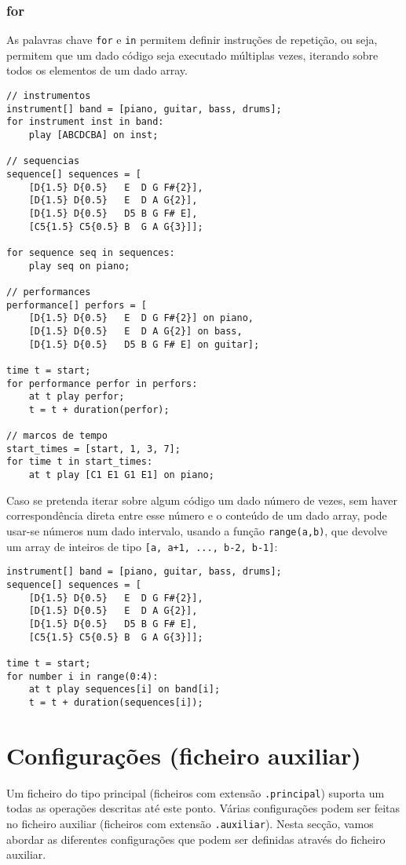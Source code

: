 \documentclass{article}
\begin{document}
\subsubsection{for}
As palavras chave \texttt{for} e \texttt{in} permitem definir instruções de repetição, ou seja, permitem que um dado código seja executado múltiplas vezes, iterando sobre todos os elementos de um dado array.
\begin{lstlisting} 
// instrumentos 
instrument[] band = [piano, guitar, bass, drums];
for instrument inst in band:
    play [ABCDCBA] on inst;

// sequencias
sequence[] sequences = [
    [D{1.5} D{0.5}   E  D G F#{2}], 
    [D{1.5} D{0.5}   E  D A G{2}],
    [D{1.5} D{0.5}   D5 B G F# E],
    [C5{1.5} C5{0.5} B  G A G{3}]];
    
for sequence seq in sequences:
    play seq on piano;
    
// performances
performance[] perfors = [
    [D{1.5} D{0.5}   E  D G F#{2}] on piano, 
    [D{1.5} D{0.5}   E  D A G{2}] on bass,
    [D{1.5} D{0.5}   D5 B G F# E] on guitar];
    
time t = start;
for performance perfor in perfors:
    at t play perfor;
    t = t + duration(perfor);

// marcos de tempo
start_times = [start, 1, 3, 7];
for time t in start_times:
    at t play [C1 E1 G1 E1] on piano;
\end{lstlisting}

Caso se pretenda iterar sobre algum código um dado número de vezes, sem haver correspondência direta entre esse número e o conteúdo de um dado array, pode usar-se números num dado intervalo, usando a função \texttt{range(a,b)}, que devolve um array de inteiros de tipo \texttt{[a, a+1, ..., b-2, b-1]}:
\begin{lstlisting} 
instrument[] band = [piano, guitar, bass, drums];
sequence[] sequences = [
    [D{1.5} D{0.5}   E  D G F#{2}], 
    [D{1.5} D{0.5}   E  D A G{2}],
    [D{1.5} D{0.5}   D5 B G F# E],
    [C5{1.5} C5{0.5} B  G A G{3}]];

time t = start;
for number i in range(0:4):
    at t play sequences[i] on band[i];
    t = t + duration(sequences[i]);
\end{lstlisting}

\section{Configurações (ficheiro auxiliar)} \label{config}
Um ficheiro do tipo principal (ficheiros com extensão \texttt{.principal}) suporta um todas as operações descritas até este ponto. 
Várias configurações podem ser feitas no ficheiro auxiliar (ficheiros com extensão \texttt{.auxiliar}). Nesta secção, vamos abordar as diferentes configurações que podem ser definidas através do ficheiro auxiliar.
\end{document}
